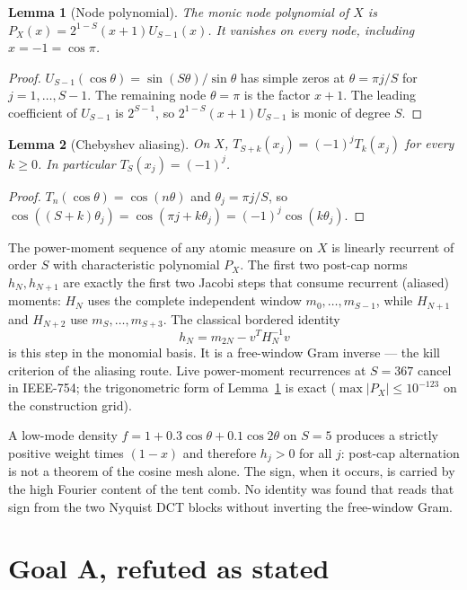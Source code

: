 \documentclass[11pt]{article}
\newtheorem{lemma}{Lemma}
\theoremstyle{remark}
\begin{document}
\begin{lemma}[Node polynomial]\label{lem:PX}
The monic node polynomial of $X$ is
$P_X(x)=2^{1-S}(x+1)U_{S-1}(x)$.  It vanishes on every node,
including $x=-1=\cos\pi$.
\end{lemma}

\begin{proof}
$U_{S-1}(\cos\theta)=\sin(S\theta)/\sin\theta$ has simple zeros
at $\theta=\pi j/S$ for $j=1,\ldots,S-1$.  The remaining node
$\theta=\pi$ is the factor $x+1$.  The leading coefficient of
$U_{S-1}$ is $2^{S-1}$, so $2^{1-S}(x+1)U_{S-1}$ is monic of
degree $S$.
\end{proof}

\begin{lemma}[Chebyshev aliasing]\label{lem:alias-T}
On $X$, $T_{S+k}(x_j)=(-1)^j T_k(x_j)$ for every $k\ge 0$.
In particular $T_S(x_j)=(-1)^j$.
\end{lemma}

\begin{proof}
$T_n(\cos\theta)=\cos(n\theta)$ and
$\theta_j=\pi j/S$, so
$\cos((S+k)\theta_j)=\cos(\pi j+k\theta_j)=(-1)^j\cos(k\theta_j)$.
\end{proof}

The power-moment sequence of any atomic measure on $X$ is
linearly recurrent of order $S$ with characteristic polynomial
$P_X$.  The first two post-cap norms $h_N,h_{N+1}$ are exactly
the first two Jacobi steps that consume recurrent (aliased)
moments: $H_N$ uses the complete independent window
$m_0,\ldots,m_{S-1}$, while $H_{N+1}$ and $H_{N+2}$ use
$m_S,\ldots,m_{S+3}$.  The classical bordered identity
\[
h_N=m_{2N}-v^T H_N^{-1}v
\]
is this step in the monomial basis.  It is a free-window Gram
inverse --- the kill criterion of the aliasing route.  Live
power-moment recurrences at $S=367$ cancel in IEEE-754;
the trigonometric form of Lemma~\ref{lem:PX} is exact
($\max|P_X|\le 10^{-123}$ on the construction grid).

A low-mode density $f=1+0.3\cos\theta+0.1\cos 2\theta$ on $S=5$
produces a strictly positive weight times $(1-x)$ and therefore
$h_j>0$ for all $j$: post-cap alternation is not a theorem of
the cosine mesh alone.  The sign, when it occurs, is carried by
the high Fourier content of the tent comb.  No identity was
found that reads that sign from the two Nyquist DCT blocks
without inverting the free-window Gram.

\section{Goal A, refuted as stated}\label{sec:A}
\end{document}
